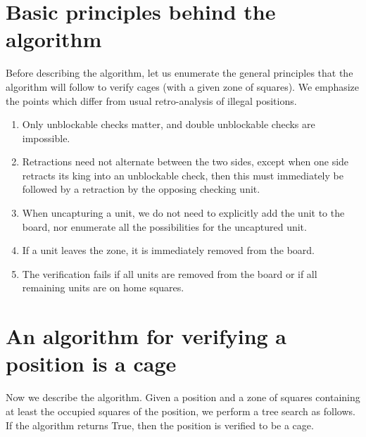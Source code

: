 \documentclass[11pt]{article}
\begin{document}
\section{Basic principles behind the algorithm}

Before describing the algorithm, let us enumerate the general principles that the algorithm will follow to verify cages (with a given zone of squares). We emphasize the points which differ from usual retro-analysis of illegal positions.

\begin{enumerate}
\item{Only unblockable checks matter, and double unblockable checks are impossible.}
\item{Retractions need not alternate between the two sides, except when one side retracts its king into an unblockable check, then this must immediately be followed by a retraction by the opposing checking unit.}
\item{When uncapturing a unit, we do not need to explicitly add the unit to the board, nor enumerate all the possibilities for the uncaptured unit.}
\item{If a unit leaves the zone, it is immediately removed from the board.}
\item{The verification fails if all units are removed from the board or if all remaining units are on home squares.}
\end{enumerate}

\section{An algorithm for verifying a position is a cage}

Now we describe the algorithm. Given a position and a zone of squares containing at least the occupied squares of the position, we perform a tree search as follows. If the algorithm returns True, then the position is verified to be a cage.
\end{document}
